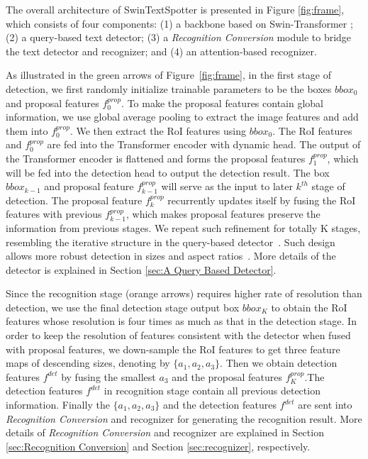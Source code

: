 \documentclass[10pt,twocolumn,letterpaper]{article}
\begin{document}
The overall architecture of SwinTextSpotter is presented in Figure \ref{fig:frame}, which consists of four components: 
(1) a backbone based on Swin-Transformer \cite{liu2021Swin};
(2) a query-based text detector; 
(3) a \textit{Recognition Conversion} module to bridge the text detector and recognizer; and 
(4) an attention-based recognizer. 

As illustrated in the green arrows of Figure~\ref{fig:frame}, in the first stage of detection, we first randomly initialize trainable parameters to be the boxes $bbox_0$ and proposal features $f_0^{prop}$. To make the proposal features contain global information, we use global average pooling to extract the image features and add them into $f_0^{prop}$.
We then extract the RoI features using $bbox_0$. 
The RoI features and $f_0^{prop}$ are fed into the Transformer encoder with dynamic head.
The output of the Transformer encoder is flattened and forms the proposal features $f_1^{prop}$, which will be fed into the detection head to output the detection result. 
The box $bbox_{k-1}$ and proposal feature $f_{k-1}^{prop}$ will serve as the input to later $k^{th}$ stage of detection. 
The proposal feature $f_k^{prop}$ recurrently updates itself by fusing the RoI features with previous $f_{k-1}^{prop}$, which makes proposal features preserve the information from previous stages. 
We repeat such refinement for totally K stages, resembling the iterative structure in the query-based detector~\cite{carion2020end,zhu2020deformable,sun2021sparse,hu2021istr}.
Such design allows more robust detection in sizes and aspect ratios~\cite{sun2021sparse}. 
More details of the detector is explained in Section \ref{sec:A Query Based Detector}.


Since the recognition stage (orange arrows) requires higher rate of resolution than detection, we use the final detection stage output box $bbox_K$ to obtain the RoI features whose resolution is four times as much as that in the detection stage. 
In order to keep the resolution of features consistent with the detector when fused with proposal features, we down-sample the RoI features to get three feature maps of descending sizes, denoting by $\{a_1,a_2,a_3\}$. 
Then we obtain detection features $f^{det}$ by fusing the smallest $a_3$ and the proposal features $f_K^{prop}$.The detection features $f^{det}$ in recognition stage contain all previous detection information. Finally the $\{a_1,a_2,a_3\}$ and the detection features $f^{det}$ are sent into \textit{Recognition Conversion} and recognizer for generating the recognition result.
More details of \textit{Recognition Conversion} and recognizer are explained in Section \ref{sec:Recognition Conversion} and Section \ref{sec:recognizer}, respectively.
\end{document}
